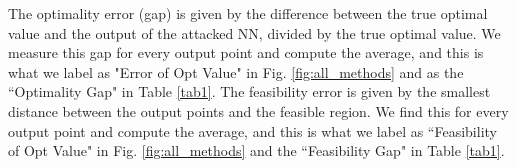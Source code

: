 
The optimality error (gap) is given by the difference between the true optimal value and the output of the attacked NN, divided by the true optimal value. We measure this gap for every output point and compute the average, and this is what we label as "Error of Opt Value" in Fig. \ref{fig:all_methods} and as the ``Optimality Gap" in Table \ref{tab1}. 
%
The feasibility error is given by the smallest distance between the output points and the feasible region. We find this for every output point and compute the average, and this is what we label as ``Feasibility of Opt Value" in Fig. \ref{fig:all_methods} and the ``Feasibility Gap" in Table \ref{tab1}.